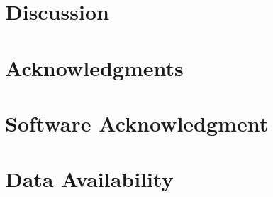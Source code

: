 \documentclass[twocolumn,apj]{openjournal}
\begin{document}
\section{Discussion} \label{sec:discussion}




\section*{Acknowledgments}





\section*{Software Acknowledgment}





\section*{Data Availability}



\clearpage



\end{document}
